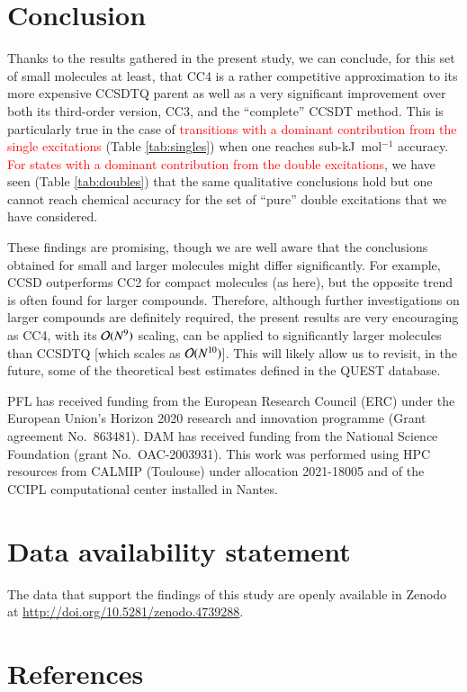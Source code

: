 \documentclass[aip,jcp,reprint,noshowkeys,superscriptaddress]{revtex4-1}
\newcommand{\alert}[1]{\textcolor{red}{#1}}
\newcommand{\titou}[1]{\textcolor{red}{#1}}
\begin{document}
\section{Conclusion}

Thanks to the results gathered in the present study, we can conclude, for this set of small molecules at least, that CC4 is a rather competitive approximation to its more expensive CCSDTQ parent as well as a very significant improvement over both its third-order version, CC3, and the ``complete'' CCSDT method.
This is particularly true in the case of \alert{transitions with a dominant contribution from the single excitations} (Table \ref{tab:singles}) when one reaches sub-kJ~mol$^{-1}$ accuracy.
\titou{For states with a dominant contribution from the double excitations}, we have seen (Table \ref{tab:doubles}) that the same qualitative conclusions hold but one cannot reach chemical accuracy for the set of ``pure'' double excitations that we have considered.

These findings are promising, though we are well aware that the conclusions obtained for small and larger molecules might differ significantly.
For example, CCSD outperforms CC2 for compact molecules (as here), but the opposite trend is often found for larger compounds.\cite{Loos_2018a,Loos_2020a,Veril_2021} 
Therefore, although further investigations on larger compounds are definitely required, the present results are very encouraging as CC4, with its $\order*{N^9}$ scaling, can be applied to significantly larger molecules than CCSDTQ [which scales as $\order*{N^{10}}$]. 
This will likely allow us to revisit, in the future, some of the theoretical best estimates defined in the QUEST database.\cite{Loos_2020a,Veril_2021}

\begin{acknowledgements}
PFL has received funding from the European Research Council (ERC) under the European Union's Horizon 2020 research and innovation programme (Grant agreement No.~863481).
DAM has received funding from the National Science Foundation (grant No.~OAC-2003931).
This work was performed using HPC resources from CALMIP (Toulouse) under allocation 2021-18005 and of the CCIPL computational center installed in Nantes.
\end{acknowledgements}

\section*{Data availability statement}
The data that support the findings of this study are openly available in Zenodo at \href{http://doi.org/10.5281/zenodo.4739288}{http://doi.org/10.5281/zenodo.4739288}.

\section*{References}

\end{document}
